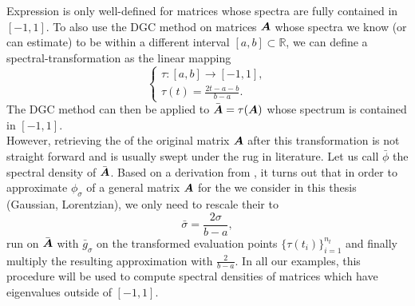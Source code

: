 Expression  is only well-defined for matrices whose spectra are fully
contained in $[-1, 1]$. To also use the \gls{DGC} method on matrices $\boldsymbol{A}$ whose
spectra we know (or can estimate) to be within a different interval $[a, b] \subset \mathbb{R}$,
we can define a \gls{spectral-transformation} as the linear mapping
\begin{equation}
    \begin{cases}
        \tau : [a, b] \to [-1, 1], \\
        \tau(t) = \frac{2t - a - b}{b - a}.
    \end{cases}
    \label{equ:2-chebyshev-spectral-transformation}
\end{equation}
The \gls{DGC} method can then be applied to $\bar{\boldsymbol{A}} = \tau(\boldsymbol{A})$ whose
spectrum is contained in $[-1, 1]$.\\

However, retrieving the  of the original
matrix $\boldsymbol{A}$ after this transformation is not straight forward
and is usually swept under the rug in literature.
Let us call $\bar{\phi}$ the spectral density of $\bar{\boldsymbol{A}}$.
Based on a derivation from , it turns out that in order
to approximate $\phi_{\sigma}$ of a general matrix $\boldsymbol{A}$
for the  we consider
in this thesis (Gaussian, Lorentzian), we only need to rescale their
 to
\begin{equation}
    \bar{\sigma} = \frac{2\sigma}{b - a},
    \label{equ:2-chebyshev-sigma-transformation}
\end{equation}
run  on $\bar{\boldsymbol{A}}$ with $\bar{g}_{\sigma}$
on the transformed evaluation points $\{ \tau(t_i) \}_{i=1}^{n_t}$ and finally
multiply the resulting approximation with $\frac{2}{b-a}$.
In all our examples, this procedure will be used to compute spectral densities
of matrices which have eigenvalues outside of $[-1, 1]$.\\

